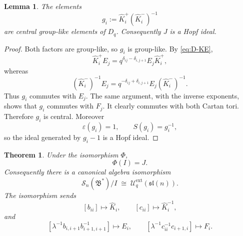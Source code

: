 \documentclass[11pt]{amsart}
\numberwithin{equation}{section}
\newtheorem{theorem}[equation]{Theorem}
\newtheorem{lemma}[equation]{Lemma}
\theoremstyle{definition}
\theoremstyle{remark}
\newcommand{\Uc}{\mathcal{U}}
\newcommand{\bcS}{\mathcal{S}}
\newcommand{\fB}{\mathfrak{B}}
\newcommand{\sln}{\mathfrak{sl}(n)}
\begin{document}
\begin{lemma}\label{lem:J-central}
The elements
\[
g_i:=\widehat K_i^{+}(\widehat K_i^{-})^{-1}
\]
are central group-like elements of \(D_q\).  Consequently \(J\) is a Hopf
ideal.
\end{lemma}

\begin{proof}
Both factors are group-like, so \(g_i\) is group-like.  By
\eqref{eq:D-KE},
\[
\widehat K_i^{+}E_j
=q^{\delta_{ij}-\delta_{i,j+1}}E_j\widehat K_i^{+},
\]
whereas
\[
(\widehat K_i^{-})^{-1}E_j
=q^{-\delta_{ij}+\delta_{i,j+1}}
 E_j(\widehat K_i^{-})^{-1}.
\]
Thus \(g_i\) commutes with \(E_j\).  The same argument, with the inverse
exponents, shows that \(g_i\) commutes with \(F_j\).  It clearly commutes with
both Cartan tori.  Therefore \(g_i\) is central.  Moreover
\[
\varepsilon(g_i)=1,
\qquad
S(g_i)=g_i^{-1},
\]
so the ideal generated by \(g_i-1\) is a Hopf ideal.
\end{proof}

\begin{theorem}\label{thm:quotient}
Under the isomorphism \(\Phi\),
\[
\Phi(I)=J.
\]
Consequently there is a canonical algebra isomorphism
\begin{equation}\label{eq:main-quotient}
\bcS_n(\fB^*)/I
\;\cong\;
\Uc_q^{\mathrm{ext}}(\sln).
\end{equation}
The isomorphism sends
\[
[b_{ii}]\longmapsto\widehat K_i,
\qquad
[c_{ii}]\longmapsto\widehat K_i^{-1},
\]
and
\[
[\lambda^{-1}b_{i,i+1}b_{i+1,i+1}^{-1}]
 \longmapsto E_i,
\qquad
[\lambda^{-1}c_{ii}^{-1}c_{i+1,i}]
 \longmapsto F_i.
\]
\end{theorem}
\end{document}
